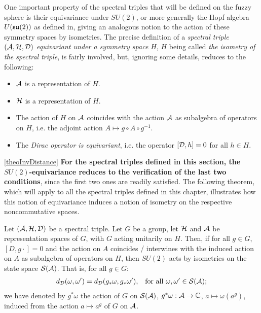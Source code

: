One important property of the spectral triples that will be defined on the fuzzy sphere is their equivariance under $SU(2)$, or more generally the Hopf algebra $U(\mathfrak{su}(2))$ as defined in\cite{Sitarz}, giving an analogous notion to the action of these symmetry spaces by isometries. The precise definition of a \textit{spectral triple $(\mathcal A, \mathcal H, \mathcal D)$ equivariant under a symmetry space $H$}, $H$ being called \textit{the isometry of the spectral triple}, is fairly involved, but, ignoring some details, reduces to the following:
    \begin{itemize}
    
    \item $\mathcal A$ is a representation of $H$.
    
    \item $\mathcal H $ is a representation of $H$.
    
    \item The action of $H$ on $\mathcal A$ coincides with the action $\mathcal A$ as subalgebra of operators on $H$, i.e. the adjoint action $A \mapsto g \circ A \circ g^{-1}$. %
    
    \item The \textit{Dirac operator is equivariant}, i.e. the operator $[\mathcal D, h] = 0$ for all $h \in H$.
    
    \end{itemize}
\ref{theoInvDistance}
\textbf{For the spectral triples defined in this section, the $SU(2)$-equivariance reduces to the verification of the last two conditions}, since the first two ones are readily satisfied. The following theorem, which will apply to all the spectral triples defined in this chapter, illustrates how this notion of equivariance induces a notion of isometry on the respective noncommutative spaces.

\begin{theorem} \label{theoGInvariantDistance}
Let $(\mathcal A, \mathcal H, \mathcal D)$ be a spectral triple. Let $G$ be a group, let $\mathcal H$ and $\mathcal A$ be representation spaces of $G$, with $G$ acting unitarily on $H$. Then, if for all $g \in G$, $[D, g\cdot] = 0$ and the action on $A$ coincides / interwines with the induced action on $A$ as subalgebra of operators on $H$, then $SU(2)$ acts by isometries on the state space $\mathcal S(\mathcal A)$. That is, for all $g \in G$:
\begin{align}
    d_\mathcal D(\omega, \omega') &= d_\mathcal D(g_* \omega, g_*\omega'), & \text{for all $\omega, \omega' \in \mathcal S(\mathcal A)$};
\end{align}
we have denoted by $g^*\omega$ the action of $G$ on $\mathcal S(\mathcal A)$, $g^* \omega: \mathcal A \to \mathbb{C}$, $a \mapsto \omega(a^g)$, induced from the action $a \mapsto a^g$ of $G$ on $\mathcal A$.
\end{theorem}

